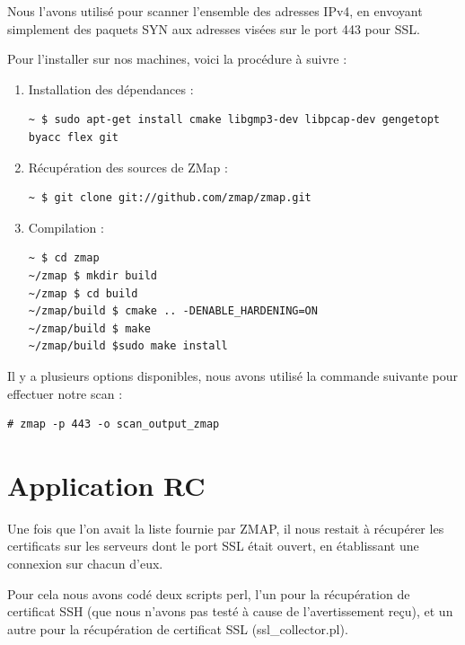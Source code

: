 \documentclass[a4paper,11pt,french]{article}
\begin{document}
Nous l'avons utilisé pour scanner l'ensemble des adresses IPv4, en envoyant simplement des paquets SYN aux adresses visées sur le port 443 pour SSL.

Pour l'installer sur nos machines, voici la procédure à suivre :

\begin{enumerate}
\item Installation des dépendances :
\begin{verbatim}
~ $ sudo apt-get install cmake libgmp3-dev libpcap-dev gengetopt byacc flex git
\end{verbatim}
\item Récupération des sources de ZMap :
\begin{verbatim}
~ $ git clone git://github.com/zmap/zmap.git
\end{verbatim}
\item Compilation :
\begin{verbatim}
~ $ cd zmap
~/zmap $ mkdir build
~/zmap $ cd build
~/zmap/build $ cmake .. -DENABLE_HARDENING=ON
~/zmap/build $ make
~/zmap/build $sudo make install
\end{verbatim}
\end{enumerate}

Il y a plusieurs options disponibles, nous avons utilisé la commande suivante pour effectuer notre scan :
\begin{verbatim}
# zmap -p 443 -o scan_output_zmap
\end{verbatim}

\section{Application RC}

Une fois que l'on avait la liste fournie par ZMAP, il nous restait à récupérer les certificats sur les serveurs dont le port SSL était ouvert, en établissant une connexion sur chacun d'eux.

Pour cela nous avons codé deux scripts perl, l'un pour la récupération de certificat SSH (que nous n'avons pas testé à cause de l'avertissement reçu), et un autre pour la récupération de certificat SSL (ssl\_collector.pl).
\end{document}
